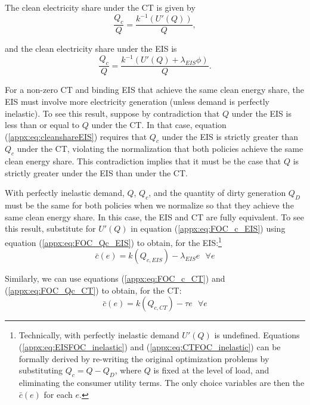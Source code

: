 \documentclass[12pt]{article}
\begin{document}
The clean electricity share under the CT is given by
\begin{equation}
    \frac{Q_c}{Q} = \frac{k^{-1}(U'(Q))}{Q}, \label{appx:eq:cleanshareCT}
\end{equation}

and the clean electricity share under the EIS is
\begin{equation}
    \frac{Q_c}{Q} = \frac{k^{-1}(U'(Q)+\lambda_{EIS}\phi)}{Q}. \label{appx:eq:cleanshareEIS}
\end{equation}

For a non-zero CT and binding EIS that achieve the same clean energy share, the EIS must involve more electricity generation (unless demand is perfectly inelastic). To see this result, suppose by contradiction that $Q$ under the EIS is less than or equal to $Q$ under the CT. In that case, equation (\ref{appx:eq:cleanshareEIS}) requires that $Q_c$ under the EIS is strictly greater than $Q_c$ under the CT, violating the normalization that both policies achieve the same clean energy share. This contradiction implies that it must be the case that $Q$ is strictly greater under the EIS than under the CT.

With perfectly inelastic demand, $Q$, $Q_c$, and the quantity of dirty generation $Q_D$ must be the same for both policies when we normalize so that they achieve the same clean energy share. In this case, the EIS and CT are fully equivalent. To see this result, substitute for $U'(Q)$ in equation (\ref{appx:eq:FOC_c_EIS}) using equation (\ref{appx:eq:FOC_Qc_EIS}) to obtain, for the EIS:\footnote{Technically, with perfectly inelastic demand $U'(Q)$ is undefined. Equations (\ref{appx:eq:EISFOC_inelastic}) and (\ref{appx:eq:CTFOC_inelastic}) can be formally derived by re-writing the original optimization problems by substituting $Q_c=Q-Q_D$, where $Q$ is fixed at the level of load, and eliminating the consumer utility terms. The only choice variables are then the $\bar{c}(e)$ for each $e$.}
\begin{equation}
    \bar{c}(e) = k(Q_{c,EIS}) - \lambda_{EIS}e \text{  } \forall e \label{appx:eq:EISFOC_inelastic}
\end{equation}

Similarly, we can use equations (\ref{appx:eq:FOC_c_CT}) and (\ref{appx:eq:FOC_Qc_CT}) to obtain, for the CT:
\begin{equation}
    \bar{c}(e) = k(Q_{c,CT}) - \tau e \text{  } \forall e \label{appx:eq:CTFOC_inelastic}
\end{equation}
\end{document}

